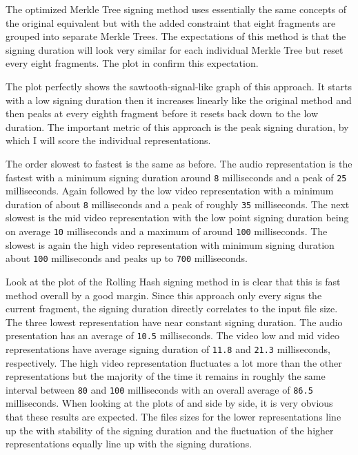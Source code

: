 The optimized Merkle Tree signing method uses essentially the same concepts of the original equivalent but with the added constraint that eight fragments are grouped into separate Merkle Trees. The expectations of this method is that the signing duration will look very similar for each individual Merkle Tree but reset every eight fragments. The plot in  confirm this expectation.

The plot perfectly shows the sawtooth-signal-like graph of this approach. It starts with a low signing duration then it increases linearly like the original method and then peaks at every eighth fragment before it resets back down to the low duration. The important metric of this approach is the peak signing duration, by which I will score the individual representations.

The order slowest to fastest is the same as before. The audio representation is the fastest with a minimum signing duration around \texttt{8} milliseconds and a peak of \texttt{25} milliseconds. Again followed by the low video representation with a minimum duration of about \texttt{8} milliseconds and a peak of roughly \texttt{35} milliseconds. The next slowest is the mid video representation with the low point signing duration being on average \texttt{10} milliseconds and a maximum of around \texttt{100} milliseconds. The slowest is again the high video representation with minimum signing duration about \texttt{100} milliseconds and peaks up to \texttt{700} milliseconds.

Look at the plot of the Rolling Hash signing method in  is clear that this is fast method overall by a good margin. Since this approach only every signs the current fragment, the signing duration directly correlates to the input file size. The three lowest representation have near constant signing duration. The audio presentation has an average of \texttt{10.5} milliseconds. The video low and mid video representations have average signing duration of \texttt{11.8} and \texttt{21.3} milliseconds, respectively. The high video representation fluctuates a lot more than the other representations but the majority of the time it remains in roughly the same interval between \texttt{80} and \texttt{100} milliseconds with an overall average of \texttt{86.5} milliseconds. When looking at the plots of  and  side by side, it is very obvious that these results are expected. The files sizes for the lower representations line up the with stability of the signing duration and the fluctuation of the higher representations equally line up with the signing durations.

